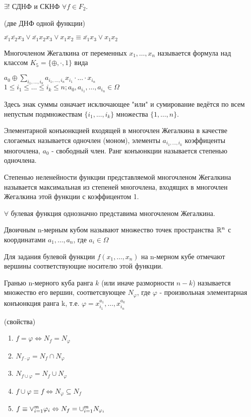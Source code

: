 \documentclass{article}
\begin{document}
\utv $\exists!$ СДНФ и СКНФ $\forall f \in F_2$.

\example (две ДНФ одной функции) \par $\overline{x_1}\overline{x_2}x_3 \vee \overline{x_1}x_2x_3 \vee x_1x_2 \equiv \overline{x_1}x_3 \vee x_1x_2$

\opr Многочленом Жегалкина от переменных $x_1, \dotsc, x_n$ называется формула над классом $K_5=\{\oplus, \cdot, 1\}$ вида
\begin{center}
	$a_0 \oplus \sum_{i_1, \dotsc,i_k} a_{i_1, \dotsc, i_n}x_{i_1}\cdot \dotsc \cdot x_{i_n}$\\$1 \leq i_1 \leq \dotsc \leq i_k \leq n; a_0, a_{i_1}, \dotsc, a_{i_n} \in \Omega$
\end{center}
Здесь знак суммы означает исключающее "или" и сумирование ведётся по всем непустым подмножествам $\{i_1, \dotsc, i_k\}$ множества $\{1, \dotsc, n\}$.

\opr Элементарной конъюнкцией входящей в многочлен Жегалкина в качестве слогаемых называется одночлен (моном), элементы $a_{i_1, \dotsc, i_k}$ коэффиценты многочлена, $a_0$ - свободный член. Ранг конъюнкции называется степенью одночлена. \par Степенью неленейности функции представляемой многочленом Жегалкина называется максимальная из степеней многочлена, входящих в многочлен Жегалкина этой функции с коэффицентом 1.

\thr $\forall$ булевая функция однозначно представима многочленом Жегалкина.

\opr Двоичным n-мерным кубом называют множество точек пространства $\mathbb{R}^n$ с координатами $a_1, \dotsc, a_n$, где $a_i \in \Omega$

Для задания булевой функции $f(x_1,\dotsc,x_n)$ на n-мерном кубе отмечают вершины соответствующие носителю этой функции.

\opr Гранью n-мерного куба ранга $k$ (или иначе разморности $n-k$) называется множество его вершин, соответсвующее $N_{\varphi}$, где $\varphi$ - произвольная элементарная конъюнкция ранга k, т.е. $\varphi = x_{i_1}^{a_1}, \dotsc, x_{i_n}^{a_k}$

\utv(свойства)
\begin{enumerate} 
	\item $f = \varphi \Leftrightarrow N_f = N_{\varphi}$
	\item $N_{f \cdot \varphi} = N_f \cap N_{\varphi}$
	\item $N_{f \cup \varphi} = N_f \cup N_{\varphi}$
	\item $f \cup \varphi \equiv f \Leftrightarrow N_{\varphi}\subseteq N_f$
	\item $f \equiv \Large\vee_{i=1}^m\varphi_i \Leftrightarrow N_f = \Large\cup_{i=1}^mN_{\varphi_i}$
\end{enumerate}
\end{document}
